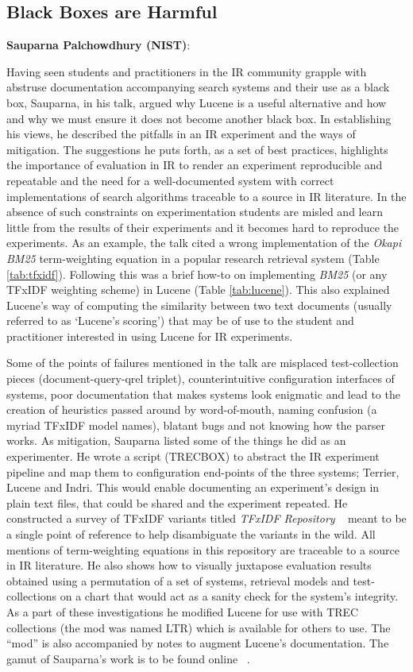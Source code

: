 \subsection*{Black Boxes are Harmful}
{\bf Sauparna Palchowdhury (NIST)}:

Having seen students and practitioners in the IR community grapple
with abstruse documentation accompanying search systems and their use
as a black box, Sauparna, in his talk, argued why Lucene is a useful
alternative and how and why we must ensure it does not become another
black box. In establishing his views, he described the pitfalls in an
IR experiment and the ways of mitigation. The suggestions he puts
forth, as a set of best practices, highlights the importance of
evaluation in IR to render an experiment reproducible and repeatable
and the need for a well-documented system with correct implementations
of search algorithms traceable to a source in IR literature. In the
absence of such constraints on experimentation students are misled and
learn little from the results of their experiments and it becomes hard
to reproduce the experiments. As an example, the talk cited a wrong
implementation of the \emph{Okapi BM25} term-weighting equation in a
popular research retrieval system (Table \ref{tab:tfxidf}). Following
this was a brief how-to on implementing \emph{BM25} (or any TFxIDF
weighting scheme) in Lucene (Table \ref{tab:lucene}). This also
explained Lucene's way of computing the similarity between two text
documents (usually referred to as `Lucene's scoring') that may be of
use to the student and practitioner interested in using Lucene for IR
experiments.

Some of the points of failures mentioned in the talk are misplaced
test-collection pieces (document-query-qrel triplet), counterintuitive
configuration interfaces of systems, poor documentation that makes
systems look enigmatic and lead to the creation of heuristics passed
around by word-of-mouth, naming confusion (a myriad TFxIDF model
names), blatant bugs and not knowing how the parser works. As
mitigation, Sauparna listed some of the things he did as an
experimenter. He wrote a script (TRECBOX) to abstract the IR
experiment pipeline and map them to configuration end-points of the
three systems; Terrier, Lucene and Indri. This would enable
documenting an experiment's design in plain text files, that could be
shared and the experiment repeated. He constructed a survey of TFxIDF
variants titled \emph{TFxIDF Repository} ~\cite{rup:TFXIDFRepository}
meant to be a single point of reference to help disambiguate the
variants in the wild. All mentions of term-weighting equations in this
repository are traceable to a source in IR literature. He also shows
how to visually juxtapose evaluation results obtained using a
permutation of a set of systems, retrieval models and test-collections
on a chart that would act as a sanity check for the system's
integrity. As a part of these investigations he modified Lucene for
use with TREC collections (the mod was named LTR) which is available
for others to use. The ``mod'' is also accompanied by notes to augment
Lucene's documentation. The gamut of Sauparna's work is to be found
online ~\cite{rup:IR}.

